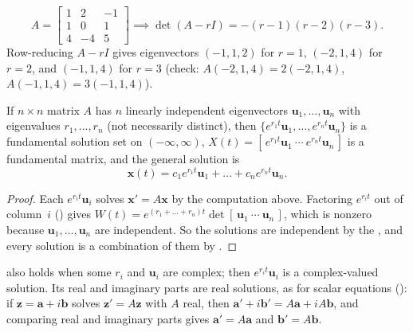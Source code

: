 \documentclass[10pt]{scrartcl}
\newcommand{\vv}[1]{\mathbf{#1}}
\begin{document}
\begin{example*}
  \[
    A = \begin{bmatrix}1&2&-1\\1&0&1\\4&-4&5\end{bmatrix}
    \implies \det(A-rI)=-(r-1)(r-2)(r-3).
  \]
  Row-reducing $A-rI$ gives eigenvectors $(-1,1,2)$ for $r=1$, $(-2,1,4)$ for $r=2$, and $(-1,1,4)$ for $r=3$ (check: $A(-2,1,4)=2(-2,1,4)$, $A(-1,1,4)=3(-1,1,4)$).
\end{example*}

\begin{theorem*}
  If $n\times n$ matrix $A$ has $n$ linearly independent eigenvectors $\vv u_1,\dots,\vv u_n$ with eigenvalues $r_1,\dots,r_n$ (not necessarily distinct), then $\{e^{r_1 t}\vv u_1,\dots,e^{r_n t}\vv u_n\}$ is a fundamental solution set on $(-\infty,\infty)$, $X(t)=[\,e^{r_1 t}\vv u_1\ \cdots\ e^{r_n t}\vv u_n\,]$ is a fundamental matrix, and the general solution is
  \[
    \vv x(t) = c_1 e^{r_1 t}\vv u_1 + \dots + c_n e^{r_n t}\vv u_n.
  \]
\end{theorem*}
\begin{proof}
  Each $e^{r_i t}\vv u_i$ solves $\vv x'=A\vv x$ by the computation above. Factoring $e^{r_i t}$ out of column~$i$ () gives $W(t)=e^{(r_1+\dots+r_n)t}\det[\,\vv u_1\ \cdots\ \vv u_n\,]$, which is nonzero because $\vv u_1,\dots,\vv u_n$ are independent. So the solutions are independent by the , and every solution is a combination of them by . \qedhere
\end{proof}
\noindent {} also holds when some $r_i$ and $\vv u_i$ are complex; then $e^{r_i t}\vv u_i$ is a complex-valued solution. Its real and imaginary parts are real solutions, as for scalar equations (): if $\vv z=\vv a+i\vv b$ solves $\vv z'=A\vv z$ with $A$ real, then $\vv a'+i\vv b'=A\vv a+iA\vv b$, and comparing real and imaginary parts gives $\vv a'=A\vv a$ and $\vv b'=A\vv b$.
\end{document}
